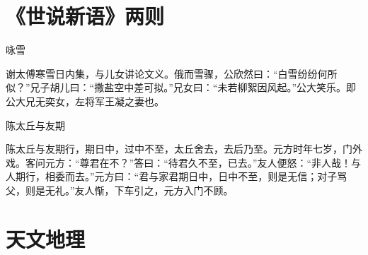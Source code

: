 \documentclass[12pt,UTF-8,openany]{ctexbook}
\begin{document}
\chapter{《世说新语》两则}

\begin{normalsize}
    
    咏雪
    
    谢太傅寒雪日内集，与儿女讲论文义。俄而雪骤，公欣然曰：“白雪纷纷何所似？”兄子胡儿曰：“撒盐空中差可拟。”兄女曰：“未若柳絮因风起。”公大笑乐。即公大兄无奕女，左将军王凝之妻也。
    
    陈太丘与友期
    
    陈太丘与友期行，期日中，过中不至，太丘舍去，去后乃至。元方时年七岁，门外戏。客问元方：“尊君在不？”答曰：“待君久不至，已去。”友人便怒：“非人哉！与人期行，相委而去。”元方曰：“君与家君期日中，日中不至，则是无信；对子骂父，则是无礼。”友人惭，下车引之，元方入门不顾。
\end{normalsize}



\chapter{天文地理}
\end{document}
